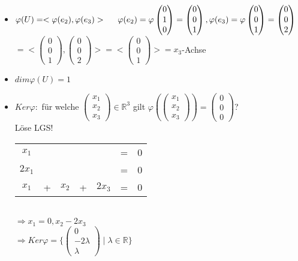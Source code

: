\documentclass[a4paper,11pt]{article}
\newcommand{\hsp}{\hspace{5mm}}
\begin{document}
\begin{itemize}
	\item $\varphi(U)=<\varphi(e_2),\varphi(e_3)>\hsp\varphi(e_2)=\varphi\begin{pmatrix}0\\1\\0\end{pmatrix}=\begin{pmatrix}0\\0\\1\end{pmatrix},\varphi(e_3)=\varphi\begin{pmatrix}0\\0\\1\end{pmatrix}=\begin{pmatrix}0\\0\\2\end{pmatrix}$ \\
	$=<\begin{pmatrix}0\\0\\1\end{pmatrix},\begin{pmatrix}0\\0\\2\end{pmatrix}>=<\begin{pmatrix}0\\0\\1\end{pmatrix}>=x_3$-Achse
	\item $dim\varphi(U)=1$
	\item $Ker\varphi:$ für welche $\begin{pmatrix}x_1\\x_2\\x_3\end{pmatrix}\in\mathbb{R}^3$ gilt $\varphi\left(\begin{pmatrix}x_1\\x_2\\x_3\end{pmatrix}\right)=\begin{pmatrix}0\\0\\0\end{pmatrix}$? \\
	Löse LGS! \\
	\begin{tabular}{ccccccc}
	$x_1$ & & & & & = & 0 \\
	$2x_1$ & & & & & = & 0 \\
	$x_1$ & + & $x_2$ & + & $2x_3$ & = & 0 \\
	\hline
	\end{tabular} \\
	$\Rightarrow x_1=0, x_2-2x_3$ \\
	$\Rightarrow Ker\varphi=\{\begin{pmatrix}0\\-2\lambda\\\lambda\end{pmatrix}\mid\lambda\in\mathbb{R}\}$
\end{itemize}
\end{document}
